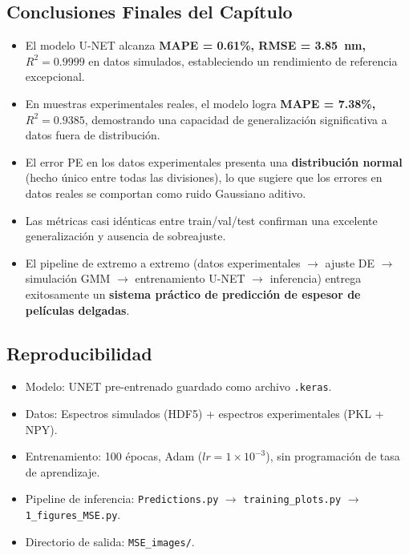 \documentclass{article}
\begin{document}
\subsection{Conclusiones Finales del Capítulo}
\begin{itemize}
\item El modelo U-NET alcanza \textbf{MAPE = 0.61\%, RMSE = 3.85~nm, $R^2 = 0.9999$} en datos simulados, estableciendo un rendimiento de referencia excepcional.
\item En muestras experimentales reales, el modelo logra \textbf{MAPE = 7.38\%, $R^2 = 0.9385$}, demostrando una capacidad de generalización significativa a datos fuera de distribución.
\item El error PE en los datos experimentales presenta una \textbf{distribución normal} (hecho único entre todas las divisiones), lo que sugiere que los errores en datos reales se comportan como ruido Gaussiano aditivo.
\item Las métricas casi idénticas entre train/val/test confirman una excelente generalización y ausencia de sobreajuste.
\item El pipeline de extremo a extremo (datos experimentales $\rightarrow$ ajuste DE $\rightarrow$ simulación GMM $\rightarrow$ entrenamiento U-NET $\rightarrow$ inferencia) entrega exitosamente un \textbf{sistema práctico de predicción de espesor de películas delgadas}.
\end{itemize}

\subsection{Reproducibilidad}
\begin{itemize}
\item Modelo: UNET pre-entrenado guardado como archivo \texttt{.keras}.
\item Datos: Espectros simulados (HDF5) + espectros experimentales (PKL + NPY).
\item Entrenamiento: 100 épocas, Adam ($lr = 1 \times 10^{-3}$), sin programación de tasa de aprendizaje.
\item Pipeline de inferencia: \texttt{Predictions.py} $\rightarrow$ \texttt{training\_plots.py} $\rightarrow$ \texttt{1\_figures\_MSE.py}.
\item Directorio de salida: \texttt{MSE\_images/}.
\end{itemize}

\newpage

\end{document}
